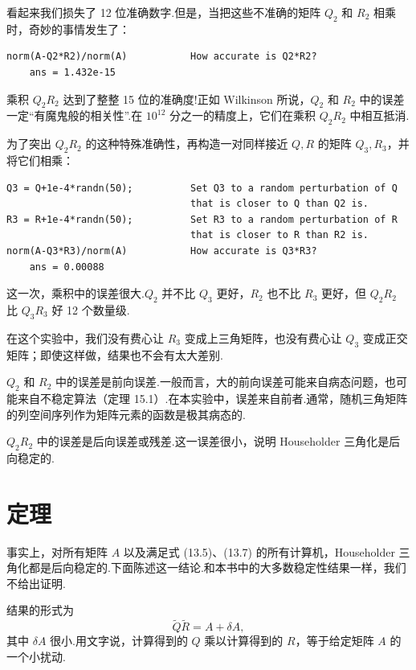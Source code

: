 \documentclass[UTF8,fontset=none,12pt]{ctexart}
\theoremstyle{definition}
\begin{document}
看起来我们损失了 12 位准确数字.但是，当把这些不准确的矩阵 $Q_2$ 和 $R_2$ 相乘时，奇妙的事情发生了：

\begin{verbatim}
norm(A-Q2*R2)/norm(A)           How accurate is Q2*R2?
    ans = 1.432e-15
\end{verbatim}

乘积 $Q_2R_2$ 达到了整整 15 位的准确度!正如 Wilkinson 所说，$Q_2$ 和 $R_2$ 中的误差一定“有魔鬼般的相关性”.在 $10^{12}$ 分之一的精度上，它们在乘积 $Q_2R_2$ 中相互抵消.

为了突出 $Q_2R_2$ 的这种特殊准确性，再构造一对同样接近 $Q,R$ 的矩阵 $Q_3,R_3$，并将它们相乘：

\begin{verbatim}
Q3 = Q+1e-4*randn(50);          Set Q3 to a random perturbation of Q
                                that is closer to Q than Q2 is.
R3 = R+1e-4*randn(50);          Set R3 to a random perturbation of R
                                that is closer to R than R2 is.
norm(A-Q3*R3)/norm(A)           How accurate is Q3*R3?
    ans = 0.00088
\end{verbatim}

这一次，乘积中的误差很大.$Q_2$ 并不比 $Q_3$ 更好，$R_2$ 也不比 $R_3$ 更好，但 $Q_2R_2$ 比 $Q_3R_3$ 好 12 个数量级.

在这个实验中，我们没有费心让 $R_3$ 变成上三角矩阵，也没有费心让 $Q_3$ 变成正交矩阵；即使这样做，结果也不会有太大差别.

$Q_2$ 和 $R_2$ 中的误差是前向误差.一般而言，大的前向误差可能来自病态问题，也可能来自不稳定算法（定理 15.1）.在本实验中，误差来自前者.通常，随机三角矩阵的列空间序列作为矩阵元素的函数是极其病态的.

$Q_2R_2$ 中的误差是后向误差或残差.这一误差很小，说明 Householder 三角化是后向稳定的.

\section*{定理}

事实上，对所有矩阵 $A$ 以及满足式 (13.5)、(13.7) 的所有计算机，Householder 三角化都是后向稳定的.下面陈述这一结论.和本书中的大多数稳定性结果一样，我们不给出证明.

结果的形式为
\begin{equation}
    \widetilde Q\widetilde R=A+\delta A,
    \tag{16.1}
\end{equation}
其中 $\delta A$ 很小.用文字说，计算得到的 $Q$ 乘以计算得到的 $R$，等于给定矩阵 $A$ 的一个小扰动.
\end{document}
